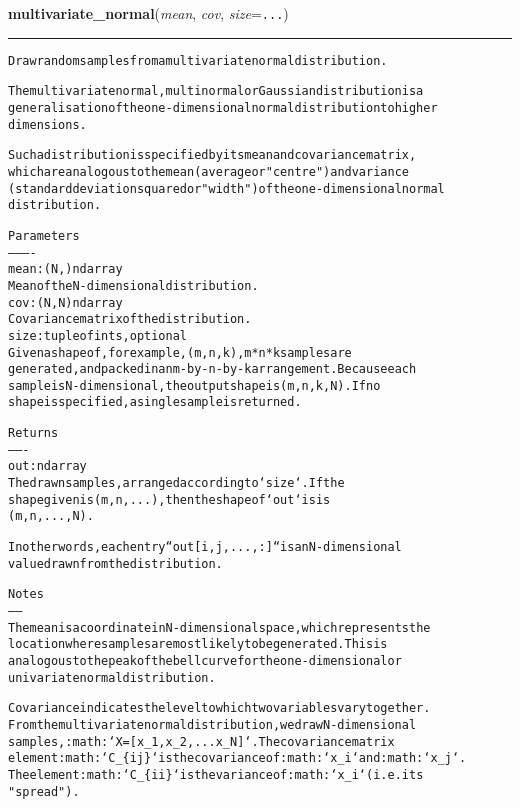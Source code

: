     \label{trunk:qstkutil:bollinger:multivariate_normal}

    \vspace{0.5ex}

\hspace{.8\funcindent}\begin{boxedminipage}{\funcwidth}

    \raggedright \textbf{multivariate\_normal}(\textit{mean}, \textit{cov}, \textit{size}={\tt ...})

    \vspace{-1.5ex}

    \rule{\textwidth}{0.5\fboxrule}
\setlength{\parskip}{2ex}
\begin{alltt}
Draw random samples from a multivariate normal distribution.

The multivariate normal, multinormal or Gaussian distribution is a
generalisation of the one-dimensional normal distribution to higher
dimensions.

Such a distribution is specified by its mean and covariance matrix,
which are analogous to the mean (average or "centre") and variance
(standard deviation squared or "width") of the one-dimensional normal
distribution.

Parameters
----------
mean : (N,) ndarray
    Mean of the N-dimensional distribution.
cov : (N,N) ndarray
    Covariance matrix of the distribution.
size : tuple of ints, optional
    Given a shape of, for example, (m,n,k), m*n*k samples are
    generated, and packed in an m-by-n-by-k arrangement.  Because each
    sample is N-dimensional, the output shape is (m,n,k,N).  If no
    shape is specified, a single sample is returned.

Returns
-------
out : ndarray
    The drawn samples, arranged according to `size`.  If the
    shape given is (m,n,...), then the shape of `out` is is
    (m,n,...,N).

    In other words, each entry ``out[i,j,...,:]`` is an N-dimensional
    value drawn from the distribution.

Notes
-----
The mean is a coordinate in N-dimensional space, which represents the
location where samples are most likely to be generated.  This is
analogous to the peak of the bell curve for the one-dimensional or
univariate normal distribution.

Covariance indicates the level to which two variables vary together.
From the multivariate normal distribution, we draw N-dimensional
samples, :math:`X = [x\_1, x\_2, ... x\_N]`.  The covariance matrix
element :math:`C\_\{ij\}` is the covariance of :math:`x\_i` and :math:`x\_j`.
The element :math:`C\_\{ii\}` is the variance of :math:`x\_i` (i.e. its
"spread").


\end{alltt}
\end{boxedminipage}
